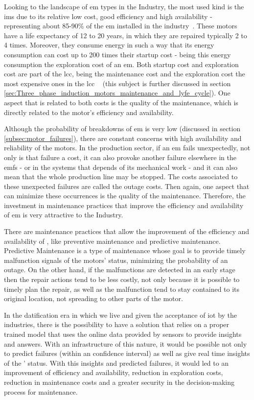 Looking to the landscape of \acrlong{em} types in the Industry, the most used kind is the \acrfull{ims} due to its relative low cost, good efficiency and high availability - representing about 85-90\% of the \acrlong{em} installed in the industry~\cite{Ferreira1}. 
These motors have a life expectancy of 12 to 20 years, in which they are repaired typically 2 to 4 times. Moreover, they consume energy in such a way that its energy consumption can cost up to 200 times their startup cost - being this energy consumption the exploration cost of an \acrlong{em}.
Both startup cost and exploration cost are part of the \acrfull{lcc}, being the maintenance cost and the exploration cost the most expensive ones in the \acrshort{lcc} ~\cite{Ferreira1} (this subject is further discussed in section \ref{sec:Three_phase_induction_motors_maintenance_and_lyfe_cycle}). One aspect that is related to both costs is the quality of the maintenance, which is directly related to the motor's efficiency and availability. 

Although the probability of breakdowns of \acrlong{em} is very low (discussed in section \ref{subsec:motor_failures}), there are constant concerns with high availability and reliability of the motors.
In the production sector, if an \acrlong{em} fails unexpectedly, not only is that failure a cost, it can also provoke another failure elsewhere in the  \acrshort{emfs} - or in the systems that depends of its mechanical work - and it can also mean that the whole production line may be stopped. The costs associated to these unexpected failures are called the outage costs. Then again, one aspect that can minimize these occurrences is the quality of the maintenance. Therefore, the investment in maintenance practices that improve the efficiency and availability of \acrlong{em} is very attractive to the Industry.

There are maintenance practices that allow the improvement of the efficiency and availability of , like preventive maintenance and predictive maintenance. 
Predictive Maintenance is a type of maintenance whose goal is to provide timely malfunction signals of the motors' status, minimizing the probability of an outage.  
On the other hand, if the malfunctions are detected in an early stage then the repair actions tend to be less costly, not only because it is possible to timely plan the repair, as well as the malfunction tend to stay contained to its original location, not spreading to other parts of the motor.


In the datification era in which we live and given the acceptance of \acrfull{iot} by the industries, there is the possibility to have a solution that relies on a proper trained model that uses the online data provided by sensors to provide insights and answers. 
With an infrastructure of this nature, it would be possible not only to predict failures (within an confidence interval) as well as give real time insights of the ' status. With this insights and predicted failures, it would led to an improvement of efficiency and availability, reduction in exploration costs, reduction in maintenance costs and a greater security in the decision-making process for maintenance.


